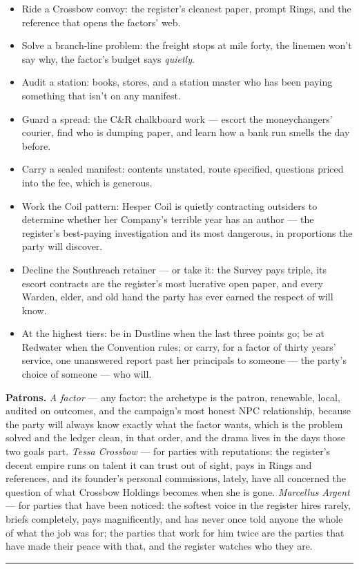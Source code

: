 \begin{itemize}
    \item Ride a Crossbow convoy: the register's cleanest paper, prompt Rings, and the reference that opens the factors' web.
    \item Solve a branch-line problem: the freight stops at mile forty, the linemen won't say why, the factor's budget says \textit{quietly}.
    \item Audit a station: books, stores, and a station master who has been paying something that isn't on any manifest.
    \item Guard a spread: the C\&R chalkboard work --- escort the moneychangers' courier, find who is dumping paper, and learn how a bank run smells the day before.
    \item Carry a sealed manifest: contents unstated, route specified, questions priced into the fee, which is generous.
    \item Work the Coil pattern: Hesper Coil is quietly contracting outsiders to determine whether her Company's terrible year has an author --- the register's best-paying investigation and its most dangerous, in proportions the party will discover.
    \item Decline the Southreach retainer --- or take it: the Survey pays triple, its escort contracts are the register's most lucrative open paper, and every Warden, elder, and old hand the party has ever earned the respect of will know.
    \item At the highest tiers: be in Dustline when the last three points go; be at Redwater when the Convention rules; or carry, for a factor of thirty years' service, one unanswered report past her principals to someone --- the party's choice of someone --- who will.
\end{itemize}

\textbf{Patrons.} \textit{A factor} --- any factor: the archetype is the patron, renewable, local, audited on outcomes, and the campaign's most honest NPC relationship, because the party will always know exactly what the factor wants, which is the problem solved and the ledger clean, in that order, and the drama lives in the days those two goals part. \textit{Tessa Crossbow} --- for parties with reputations: the register's decent empire runs on talent it can trust out of sight, pays in Rings and references, and its founder's personal commissions, lately, have all concerned the question of what Crossbow Holdings becomes when she is gone. \textit{Marcellus Argent} --- for parties that have been noticed: the softest voice in the register hires rarely, briefs completely, pays magnificently, and has never once told anyone the whole of what the job was for; the parties that work for him twice are the parties that have made their peace with that, and the register watches who they are.

\medskip\hrule\medskip
